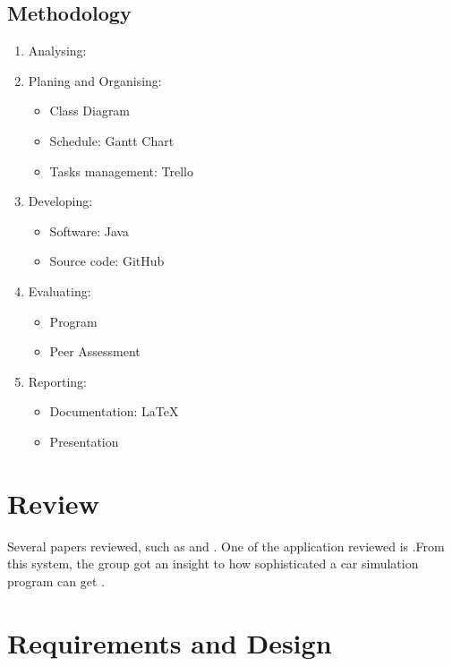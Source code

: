 \documentclass[11pt]{article}
\begin{document}
	
\subsection{Methodology}
\begin{enumerate}
\item Analysing: 
\item Planing and Organising:
    \begin{itemize}[noitemsep]
	\item Class Diagram
	\item Schedule: Gantt Chart
	\item Tasks management: Trello
	\end{itemize}
\item Developing:
	\begin{itemize}[noitemsep]
	\item Software: Java
	\item Source code: GitHub
	\end{itemize}
\item 	Evaluating:
	\begin{itemize}[noitemsep]
	\item Program
	\item Peer Assessment
	\end{itemize}
\item  	Reporting:
	\begin{itemize}[noitemsep]
	\item Documentation: LaTeX
	\item Presentation
	\end{itemize}
\end{enumerate}

\section{Review}

Several papers reviewed, such as \cite{SewWilMer10} and \cite{NameUeda05}.  One of the application reviewed is   .From this system, the group got an insight to how sophisticated a car simulation program can get .  

\newpage
\section{Requirements and Design}
\end{document}
